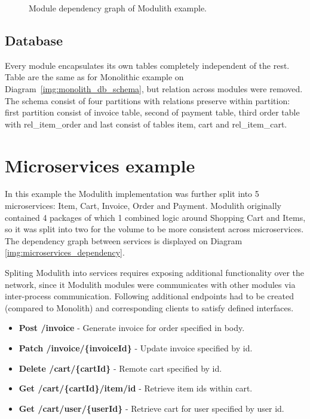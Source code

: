 \begin{figure}
    \centering
    
    \caption{Module dependency graph of Modulith example. \label{img:modulith_package}}
\end{figure}

\subsection{Database}
Every module encapsulates its own tables completely independent of the rest. Table are the same as for Monolithic example on Diagram~\ref{img:monolith_db_schema}, but relation across modules were removed. The schema consist of four partitions with relations preserve within partition: first partition consist of invoice table, second of payment table, third order table with rel\_item\_order and last consist of tables item, cart and rel\_item\_cart.


\section{Microservices example}
In this example the Modulith implementation was further split into 5 microservices: Item, Cart, Invoice, Order and Payment. Modulith originally contained 4 packages of which 1 combined logic around Shopping Cart and Items, so it was split into two for the volume to be more consistent across microservices. The dependency graph between services is displayed on Diagram \ref{img:microservices_dependency}.

Spliting Modulith into services requires exposing additional functionality over the network, since it Modulith modules were communicates with other modules via inter-process communication. Following additional endpoints had to be created (compared to Monolith) and corresponding clients to satisfy defined interfaces.

\begin{itemize}
    \item \textbf{Post /invoice} - Generate invoice for order specified in body.
    \item \textbf{Patch /invoice/\{invoiceId\}} - Update invoice specified by id.
    \item \textbf{Delete /cart/\{cartId\}} - Remote cart specified by id.
    \item \textbf{Get /cart/\{cartId\}/item/id} - Retrieve item ids within cart.
    \item \textbf{Get /cart/user/\{userId\}} - Retrieve cart for user specified by user id.
\end{itemize}

